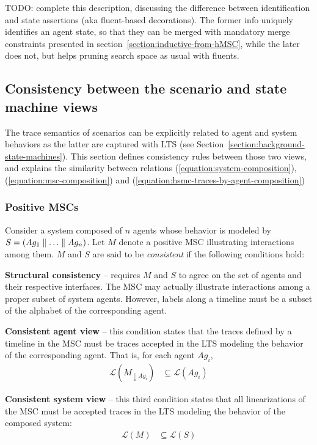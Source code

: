 TODO: complete this description, discussing the difference between identification and state assertions (aka fluent-based decorations). The former info uniquely identifies an agent state, so that they can be merged with mandatory merge constraints presented in section~\ref{section:inductive-from-hMSC}, while the later does not, but helps pruning search space as usual with fluents.

\subsection{Consistency between the scenario and state machine views\label{subsection:background-scenario-consistency}}

The trace semantics of scenarios can be explicitly related to agent and system behaviors as the latter are captured with LTS (see Section~\ref{section:background-state-machines}). This section defines consistency rules between those two views, and explains the similarity between relations (\ref{equation:system-composition}), (\ref{equation:msc-composition}) and (\ref{equation:hsmc-traces-by-agent-composition})

\subsubsection*{Positive MSCs}

Consider a system composed of $n$ agents whose behavior is modeled by $S = (Ag_1 \parallel \ldots \parallel Ag_n)$. Let $M$ denote a positive MSC illustrating interactions among them. $M$ and $S$ are said to be \emph{consistent} if the following conditions hold:

\noindent \textbf{Structural consistency} -- requires $M$ and $S$ to agree on the set of agents and their respective interfaces. The MSC may actually illustrate interactions among a proper subset of system agents. However, labels along a timeline must be a subset of the alphabet of the corresponding agent.

\noindent \textbf{Consistent agent view} -- this condition states that the traces defined by a timeline in the MSC must be traces accepted in the LTS modeling the behavior of the corresponding agent. That is, for each agent $Ag_i$,
\begin{align}\mathcal{L}(M_{\downarrow Ag_i}) & \subseteq \mathcal{L}(Ag_i)\label{condition:consistent-agent-view}\end{align}

\noindent \textbf{Consistent system view} -- this third condition states that all linearizations of the MSC must be accepted traces in the LTS modeling the behavior of the composed system:
\begin{align}\mathcal{L}(M) & \subseteq \mathcal{L}(S)\label{condition:consistent-system-view}\end{align}

